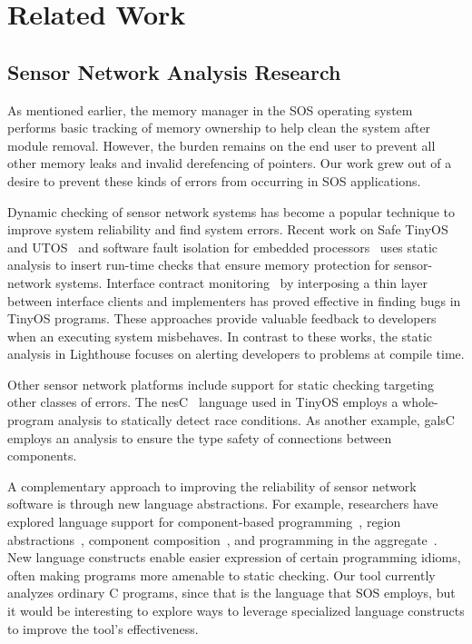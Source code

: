\section{Related Work}
\label{sec:related}

\subsection{Sensor Network Analysis Research}

As mentioned earlier, the memory manager in the SOS operating
system~\cite{sos} performs basic tracking of memory ownership to help
clean the system after module removal.
%
However, the burden remains on the end user to prevent all other memory
leaks and invalid derefencing of pointers.
%
Our work grew out of a desire to prevent these kinds of errors from
occurring in SOS applications.



Dynamic checking of sensor network systems has become a popular technique to
improve system reliability and find system errors.
%
Recent work on Safe TinyOS and UTOS~\cite{regehr06memory} and software fault
isolation for embedded processors~\cite{kumar07memory} uses static analysis
to insert run-time checks that ensure memory protection for sensor-network
systems.
%
Interface contract monitoring~\cite{archer07interface} by interposing a thin
layer between interface clients and implementers has proved effective in
finding bugs in TinyOS programs.
%
These approaches provide valuable feedback to developers when an executing
system misbehaves.
%
In contrast to these works, the static analysis in Lighthouse focuses on
alerting developers to problems at compile time.



Other sensor network platforms include support for static checking targeting
other classes of errors.  
%
The nesC~\cite{nesC} language used in TinyOS employs a whole-program
analysis to statically detect race conditions.  
%
As another example, galsC~\cite{TinyGALS,galsC} employs an analysis to
ensure the type safety of connections between components.  



A complementary approach to improving the reliability of sensor network
software is through new language abstractions.  
%
For example, researchers have explored language support for component-based
programming~\cite{TinyOS,nesC,galsC}, region
abstractions~\cite{conf/mobisys/WhitehouseSCB04,conf/nsdi/WelshM04},
component composition~\cite{conf/sensys/GreensteinKE04}, and programming in
the aggregate~\cite{1052213,conf/dcoss/GummadiGG05}.
%
New language constructs enable easier expression of certain programming
idioms, often making programs more amenable to static checking.  
%
Our tool currently analyzes ordinary C programs, since that is the language
that SOS employs, but it would be interesting to explore ways to leverage
specialized language constructs to improve the tool's effectiveness.



